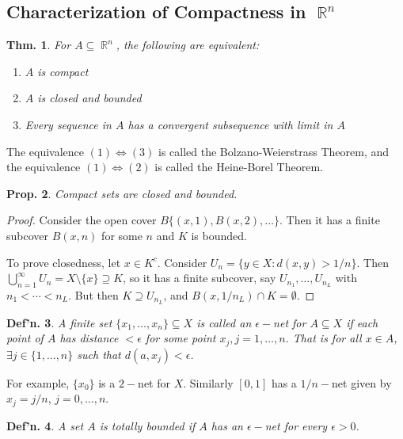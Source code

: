 \documentclass[12pt, a4paper]{book}
\DeclareMathOperator{\R}{\mathbb{R}}
\newtheorem{theorem}{Thm.}[section]
\newtheorem{definition}[theorem]{Def'n.}
\newtheorem{proposition}[theorem]{Prop.}
\theoremstyle{nonumberplain}
\newtheorem{proof}{Proof}
\begin{document}
\subsection{Characterization of Compactness in $\R^n$}
\begin{theorem}
    For $A\subseteq\R^n$, the following are equivalent:
    \begin{enumerate}
        \item $A$ is compact
        \item $A$ is closed and bounded
        \item Every sequence in $A$ has a convergent subsequence with limit in $A$
    \end{enumerate}
\end{theorem}
The equivalence $(1)\Leftrightarrow(3)$ is called the Bolzano-Weierstrass Theorem, and the equivalence $(1)\Leftrightarrow(2)$
is called the Heine-Borel Theorem.
\begin{proposition}
    Compact sets are closed and bounded.
\end{proposition}
\begin{proof}
    Consider the open cover $B\{(x,1),B(x,2),\ldots\}$. Then it has a finite subcover $B(x,n)$ for some $n$ and $K$ is
    bounded.

    To prove closedness, let $x\in K^c$. Consider $U_n=\{y\in X:d(x,y)>1/n\}$. Then $\bigcup_{n=1}^\infty U_n=X\setminus\{x\}\supseteq K$,
    so it has a finite subcover, say $U_{n_1},\ldots,U_{n_L}$ with $n_1<\cdots<n_L$. But then $K\supseteq U_{n_L}$, and
    $B(x,1/n_L)\cap K=\emptyset$.
\end{proof}
\begin{definition}
    A finite set $\{x_1,\ldots,x_n\}\subseteq X$ is called an \textit{$\epsilon-$net for $A\subseteq X$} if each point of
    $A$ has distance $<\epsilon$ for some point $x_j,j=1,\ldots,n$. That is for all $x\in A$, $\exists j\in\{1,\ldots,n\}$
    such that $d(a,x_j)<\epsilon$.
\end{definition}
For example, $\{x_0\}$ is a $2-$net for $X$. Similarly $[0,1]$ has a $1/n-$net given by $x_j=j/n$, $j=0,\ldots,n$.
\begin{definition}
    A set $A$ is totally bounded if $A$ has an $\epsilon-$net for every $\epsilon>0$.
\end{definition}
\end{document}
